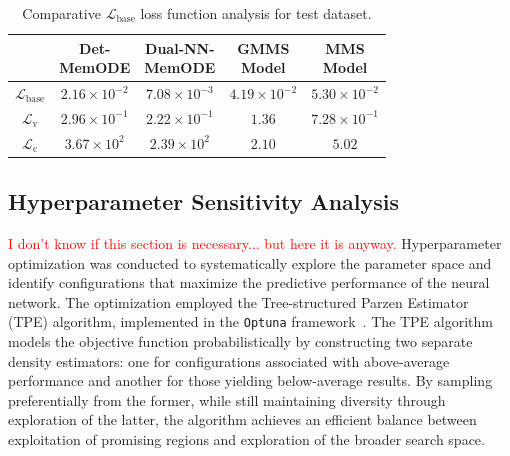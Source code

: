 \documentclass[lettersize,journal]{IEEEtran}
\newcommand{\TODO}[1]{\textcolor{red}{#1}}
\begin{document}
\begin{table}
  \caption{Comparative \(\mathcal{L}_{\mathrm{base}}\) loss function analysis for test dataset.}
  \label{tab:mms_comp_test}
  \begin{tabular}{c|cccc}
    \toprule

                                  & \makecell{Det-                                                                                                                                                                             \\MemODE}             & \makecell{Dual-NN-                                                                                                             \\ MemODE}                 & \makecell{GMMS\\Model}             & \makecell{MMS\\Model}                                        \\
    \midrule
    $\mathcal{L}_{\mathrm{base}}$ & $2.16 \times 10^{-2}$                          & \color{ieeegreen} \bfseries $7.08 \times 10^{-3}$ & $4.19 \times 10^{-2}$               & \color{ieeered} \bfseries $5.30 \times 10^{-2}$ \\
    $\mathcal{L}_{\mathrm{v}}$    & $2.96 \times 10^{-1}$                          & \color{ieeegreen} \bfseries $2.22 \times 10^{-1}$ & \color{ieeered} \bfseries $1.36 $   & $7.28 \times 10^{-1}$                           \\
    $\mathcal{L}_{\mathrm{c}}$    & \color{ieeered} \bfseries $3.67 \times 10^{2}$ & $2.39 \times 10^{2}$                              & \color{ieeegreen} \bfseries $2.10 $ & $5.02 $                                         \\
    \bottomrule
  \end{tabular}
\end{table}

\subsection{Hyperparameter Sensitivity Analysis}
\TODO{I don't know if this section is necessary... but here it is anyway.}
\noindent Hyperparameter optimization was conducted to systematically explore the parameter space and identify configurations that maximize the predictive performance of the neural network. The optimization employed the Tree-structured Parzen Estimator (TPE) algorithm, implemented in the \verb|Optuna| framework~\cite{akiba2019optuna}. The TPE algorithm models the objective function probabilistically by constructing two separate density estimators: one for configurations associated with above-average performance and another for those yielding below-average results. By sampling preferentially from the former, while still maintaining diversity through exploration of the latter, the algorithm achieves an efficient balance between exploitation of promising regions and exploration of the broader search space.
\end{document}
